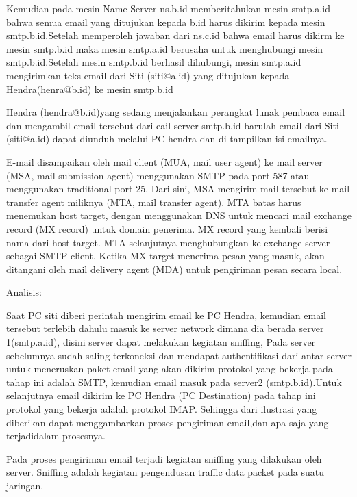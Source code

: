 \documentclass{wileySix}
\begin{document}
\begin{myEnumerate}
\begin{itemize}
		\vspace{12pt}
		Kemudian pada mesin Name Server ns.b.id memberitahukan mesin smtp.a.id bahwa semua email yang ditujukan kepada b.id harus dikirim kepada mesin smtp.b.id.Setelah memperoleh jawaban dari ns.c.id bahwa email harus dikirm ke mesin smtp.b.id maka mesin smtp.a.id berusaha untuk menghubungi mesin smtp.b.id.Setelah mesin smtp.b.id berhasil dihubungi, mesin smtp.a.id mengirimkan teks email dari Siti (siti@a.id) yang ditujukan kepada Hendra(henra@b.id) ke mesin smtp.b.id \par
		\vspace{12pt}
		Hendra (hendra@b.id)yang sedang menjalankan perangkat lunak pembaca email dan mengambil email tersebut dari eail server smtp.b.id barulah email dari Siti (siti@a.id) dapat diunduh melalui PC hendra dan di tampilkan isi emailnya. \par
		\vspace{12pt}
		E-mail disampaikan oleh mail client (MUA, mail user agent) ke mail server (MSA, mail submission agent) menggunakan SMTP pada port 587 atau menggunakan traditional port 25. Dari sini, MSA mengirim mail tersebut ke mail transfer agent miliknya (MTA, mail transfer agent). MTA batas harus menemukan host target, dengan menggunakan DNS untuk mencari mail exchange record (MX record) untuk domain penerima. MX record yang kembali berisi nama dari host target. MTA selanjutnya menghubungkan ke exchange server sebagai SMTP client. Ketika MX target menerima pesan yang masuk, akan ditangani oleh mail delivery agent (MDA) untuk pengiriman pesan secara local. \par
		\vspace{12pt}
		Analisis: \par
		Saat PC siti diberi perintah mengirim email ke PC Hendra, kemudian email tersebut terlebih dahulu masuk ke server network dimana dia berada server 1(smtp.a.id), disini server dapat melakukan kegiatan sniffing, Pada server sebelumnya sudah saling terkoneksi dan mendapat authentifikasi dari antar server untuk meneruskan paket email yang akan dikirim protokol yang bekerja pada tahap ini adalah SMTP, kemudian email masuk pada server2 (smtp.b.id).Untuk selanjutnya email dikirim ke PC Hendra (PC Destination) pada tahap ini protokol yang bekerja adalah protokol IMAP. Sehingga dari ilustrasi yang diberikan dapat menggambarkan proses pengiriman email,dan apa saja yang terjadidalam prosesnya. \par
		\vspace{12pt}
		Pada proses pengiriman email terjadi kegiatan sniffing yang dilakukan oleh server. Sniffing adalah kegiatan pengendusan traffic data packet pada suatu jaringan. \par

\end{itemize}
\end{myEnumerate}
\end{document}
